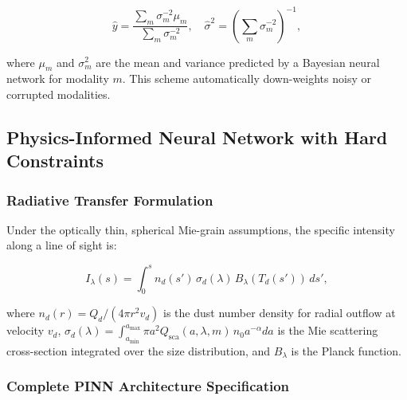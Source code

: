 \documentclass[usenatbib]{mnras}
\begin{document}
\begin{equation}\label{eq:uncertainty_fusion}
\hat{y} = \frac{\sum_m \sigma_m^{-2} \mu_m}{\sum_m \sigma_m^{-2}}, \quad \hat{\sigma}^2 = \left(\sum_m \sigma_m^{-2}\right)^{-1},
\end{equation}

where $\mu_m$ and $\sigma_m^2$ are the mean and variance predicted by a Bayesian neural network for modality $m$. This scheme automatically down-weights noisy or corrupted modalities.

\subsection{Physics-Informed Neural Network with Hard Constraints}\label{sec:pinn}

\subsubsection{Radiative Transfer Formulation}

Under the optically thin, spherical Mie-grain assumptions, the specific intensity along a line of sight is:

\begin{equation}\label{eq:thin_dust}
I_\lambda(s) = \int_{0}^{s} n_d(s') \, \sigma_d(\lambda) \, B_\lambda(T_d(s')) \, ds',
\end{equation}

where $n_d(r) = Q_d / (4\pi r^2 v_d)$ is the dust number density for radial outflow at velocity $v_d$, $\sigma_d(\lambda) = \int_{a_{\min}}^{a_{\max}} \pi a^2 Q_{\text{sca}}(a,\lambda,m) \, n_0 a^{-\alpha} da$ is the Mie scattering cross-section integrated over the size distribution, and $B_\lambda$ is the Planck function.

\subsubsection{Complete PINN Architecture Specification}\label{sec:arch}
\end{document}
